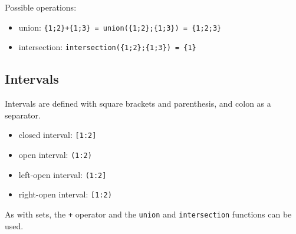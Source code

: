 Possible operations:
\begin{itemize}
\item union: \texttt{\{1;2\}+\{1;3\} = union(\{1;2\};\{1;3\}) = \{1;2;3\}}
\item intersection: \texttt{intersection(\{1;2\};\{1;3\}) = \{1\}}
\end{itemize}

\subsection{Intervals}
Intervals are defined with square brackets and parenthesis, and colon as a separator.
\begin{itemize}
\item closed interval: \texttt{[1:2]}
\item open interval: \texttt{(1:2)}
\item left-open interval: \texttt{(1:2]}
\item right-open interval: \texttt{[1:2)}
\end{itemize}
As with sets, the \texttt{+} operator and the \texttt{union} and \texttt{intersection} functions can be used.

